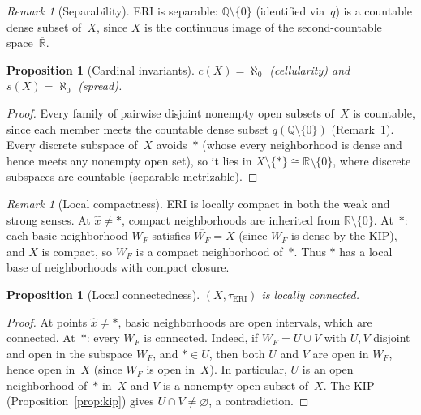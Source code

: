 \documentclass[11pt]{article}
\newtheorem{proposition}[theorem]{Proposition}
\theoremstyle{definition}
\theoremstyle{remark}
\newtheorem{remark}[theorem]{Remark}
\begin{document}
\begin{remark}[Separability]\label{rmk:separable}
ERI is separable: $\mathbb{Q}\setminus\{0\}$ (identified via~$q$) is a
countable dense subset of~$X$, since $X$ is the continuous image
of the second-countable space~$\overline{\mathbb{R}}$.
\end{remark}

\begin{proposition}[Cardinal invariants]\label{prop:cardinal}
$c(X) = \aleph_0$ \textup{(}cellularity\textup{)} and
$s(X) = \aleph_0$ \textup{(}spread\textup{)}.
\end{proposition}
\begin{proof}
Every family of pairwise disjoint nonempty open subsets of~$X$
is countable, since each member meets the countable dense subset
$q(\mathbb{Q}\setminus\{0\})$ (Remark~\ref{rmk:separable}).
Every discrete subspace of~$X$ avoids~$\ast$ (whose every
neighborhood is dense and hence meets any nonempty open set), so it
lies in $X \setminus \{\ast\} \cong \mathbb{R}\setminus\{0\}$,
where discrete subspaces are countable (separable metrizable).
\end{proof}

\begin{remark}[Local compactness]\label{rmk:localcompact}
ERI is locally compact in both the weak and strong senses.
At $\hat{x} \neq \ast$, compact neighborhoods are inherited from
$\mathbb{R}\setminus\{0\}$.
At~$\ast$: each basic neighborhood $W_F$ satisfies
$\overline{W_F} = X$ (since $W_F$ is dense by the KIP), and $X$ is
compact, so $\overline{W_F}$ is a compact neighborhood of~$\ast$.
Thus $\ast$ has a local base of neighborhoods with compact closure.
\end{remark}

\begin{proposition}[Local connectedness]\label{prop:localconn}
$(X, \tau_{\mathrm{ERI}})$ is locally connected.
\end{proposition}
\begin{proof}
At points $\hat{x} \neq \ast$, basic neighborhoods are open intervals,
which are connected.
At~$\ast$: every $W_F$ is connected.
Indeed, if $W_F = U \cup V$ with $U, V$ disjoint and open in the
subspace $W_F$, and $\ast \in U$, then both $U$ and $V$ are open
in $W_F$, hence open in~$X$ (since $W_F$ is open in~$X$).
In particular, $U$ is an open neighborhood of~$\ast$ in~$X$ and $V$
is a nonempty open subset of~$X$.
The KIP (Proposition~\ref{prop:kip}) gives $U \cap V \neq \varnothing$,
a contradiction.
\end{proof}
\end{document}
